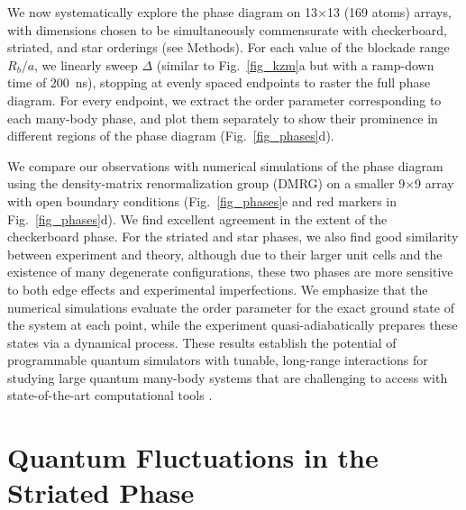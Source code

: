 \documentclass[reprint,twocolumn,secnumarabic,amssymb, aps, prl]{revtex4-1}
\begin{document}
We now systematically explore the phase diagram on 13$\times$13 (169 atoms) arrays, with dimensions chosen to be simultaneously commensurate with checkerboard, striated, and star orderings (see Methods). For each value of the blockade range $R_b/a$, we linearly sweep $\Delta$ (similar to Fig.~\ref{fig_kzm}a but with a ramp-down time of 200~ns), stopping at evenly spaced endpoints to raster the full phase diagram.
For every endpoint, we extract the order parameter corresponding to each many-body phase, and plot them separately to show their prominence in different regions of the phase diagram (Fig.~\ref{fig_phases}d).

We compare our observations with numerical simulations of the phase diagram using the density-matrix renormalization group (DMRG) on a smaller 9$\times$9 array with open boundary conditions (Fig.~\ref{fig_phases}e and red markers in Fig.~\ref{fig_phases}d). We find excellent agreement in the extent of the checkerboard phase. For the striated and star phases, we also find good similarity between experiment and theory, although due to their larger unit cells and  the existence of many degenerate configurations, these two phases are more sensitive to both edge effects and experimental imperfections. We emphasize that the numerical simulations evaluate the order parameter for the exact ground state of the system at each point, while the experiment quasi-adiabatically prepares these states via a dynamical process. These results establish the potential of programmable quantum simulators with tunable, long-range interactions for studying large quantum many-body systems that are challenging to access with  state-of-the-art computational tools \cite{Montangero2020}. 

\section{Quantum Fluctuations in the Striated Phase}
\end{document}
